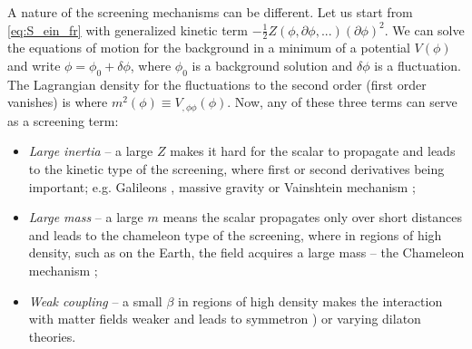 A nature of the screening mechanisms can be different. Let us start from \eqref{eq:S_ein_fr} with generalized kinetic term $-\frac12 Z(\phi,\partial\phi,...)(\partial\phi)^2$. We can solve the equations of motion for the background in a minimum of a potential $V(\phi)$ and write $\phi=\phi_0+\delta\phi$, where $\phi_0$ is a background solution and $\delta\phi$ is a fluctuation. The Lagrangian density for the fluctuations to the second order (first order vanishes) is
where $m^2(\phi)\equiv V_{,\phi\phi}(\phi)$. Now, any of these three terms can serve as a screening term:
\begin{itemize}
	\item  \textit{Large inertia} -- a large $Z$ makes it hard for the scalar to propagate and leads to the kinetic type of the screening, where first or second derivatives being important; e.g. Galileons \parencite{2009PhRvD..79f4036N}, massive gravity \parencite{2012RvMP...84..671H} or Vainshtein mechanism \parencite{2013CQGra..30r4001B};
	\item \textit{Large mass} --  a large $m$ means the scalar propagates only over short distances and leads to the chameleon type of the screening, where in regions of high density, such as on the Earth, the field acquires a large mass -- the Chameleon mechanism \parencite{Waterhouse:2006wv};
	\item \textit{Weak coupling} -- a small $\beta$ in regions of high density makes the interaction with matter fields weaker and leads to symmetron \parencite{2010PhRvL.104w1301H}) or varying dilaton \parencite{Damour:1994zq,2011PhRvD..83j4026B} theories.
\end{itemize}